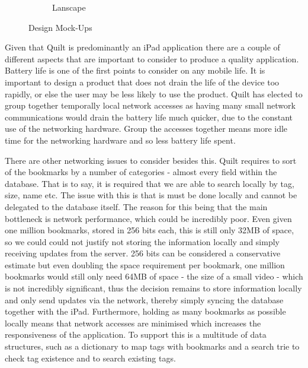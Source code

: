 \documentclass[a4wide, 10pt]{article}
\begin{document}
\begin{figure}
\begin{subfigure}[b]{0.4\textwidth}
                \caption{Lanscape}
        \end{subfigure}
        \caption{Design Mock-Ups}\label{fig:design}
\end{figure}

Given that Quilt is predominantly an iPad application there are a couple of different aspects that are important to consider to produce a quality application. Battery life is one of the first points to consider on any mobile life. It is important to design a product that does not drain the life of the device too rapidly, or else the user may be less likely to use the product. Quilt has elected to group together temporally local network accesses as having many small network communications would drain the battery life much quicker, due to the constant use of the networking hardware. Group the accesses together means more idle time for the networking hardware and so less battery life spent. 

There are other networking issues to consider besides this. Quilt requires to sort of the bookmarks by a number of categories - almost every field within the database. That is to say, it is required that we are able to search locally by tag, size, name etc. The issue with this is that is must be done locally and cannot be delegated to the database itself. The reason for this being that the main bottleneck is network performance, which could be incredibly poor. Even given one million bookmarks, stored in 256 bits each, this is still only 32MB of space, so we could could not justify not storing the information locally and simply receiving updates from the server. 256 bits can be considered a conservative estimate but even doubling the space requirement per bookmark, one million bookmarks would still only need 64MB of space - the size of a small video - which is not incredibly significant, thus the decision remains to store information locally and only send updates via the network, thereby simply syncing the database together with the iPad. Furthermore, holding as many bookmarks as possible locally means that  network accesses are minimised which increases the responsiveness of the application. To support this is a multitude of data structures, such as a dictionary to map tags with bookmarks and a search trie to check tag existence and to search existing tags.
\end{document}
